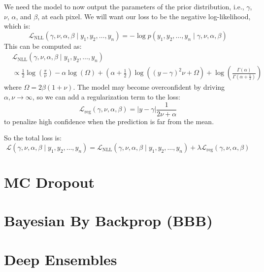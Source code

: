 \documentclass{article}
\newcommand{\f}{\frac}
\newcommand{\0}{\varnothing}
\theoremstyle{definition}
\begin{document}
We need the model to now output the parameters of the prior distribution, i.e., $\gamma$, $\nu$, $\alpha$, and $\beta$, at each pixel. We will want our loss to be the negative log-likelihood, which is:
$$\mathcal{L}_\mathrm{NLL}(\gamma, \nu, \alpha, \beta \mid y_1, y_2, \ldots, y_n) = -\log p(y_1, y_2, \ldots, y_n \mid \gamma, \nu, \alpha, \beta)$$
This can be computed as:
\begin{align*}
    &\mathcal{L}_\mathrm{NLL}(\gamma, \nu, \alpha, \beta \mid y_1, y_2, \ldots, y_n) \\
    &\propto \f{1}{2}\log\left(\f{\pi}{\nu}\right) - \alpha\log(\Omega) + \left(\alpha + \f{1}{2}\right)\log((y - \gamma)^2\nu + \Omega) + \log\left(\f{\Gamma(\alpha)}{\Gamma\left(\alpha + \f{1}{2}\right)}\right)
\end{align*}
where $\Omega = 2\beta(1 + \nu)$. The model may become overconfident by driving $\alpha,\nu \to \infty$, so we can add a regularization term to the loss:
$$\mathcal{L}_\mathrm{reg}(\gamma, \nu, \alpha, \beta) = |y - \gamma|\f{1}{2\nu + \alpha}$$
to penalize high confidence when the prediction is far from the mean.

So the total loss is:
$$\mathcal{L}(\gamma, \nu, \alpha, \beta \mid y_1, y_2, \ldots, y_n) = \mathcal{L}_\mathrm{NLL}(\gamma, \nu, \alpha, \beta \mid y_1, y_2, \ldots, y_n) + \lambda\mathcal{L}_\mathrm{reg}(\gamma, \nu, \alpha, \beta)$$

\section{MC Dropout}

\section{Bayesian By Backprop (BBB)}

\section{Deep Ensembles}



\end{document}
